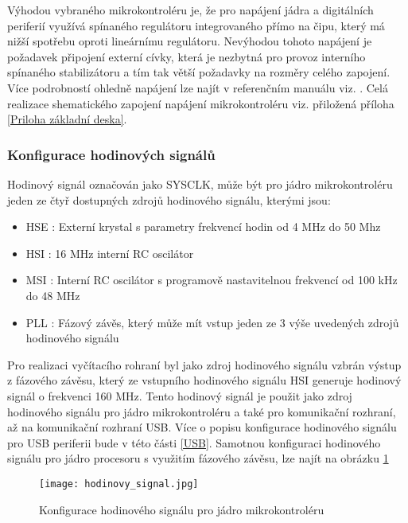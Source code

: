 	Výhodou vybraného mikrokontroléru je, že pro napájení jádra a digitálních periferií využívá spínaného regulátoru integrovaného přímo na čipu, který má nižší spotřebu oproti lineárnímu regulátoru. Nevýhodou tohoto napájení je požadavek připojení externí cívky, která je nezbytná pro provoz interního spínaného stabilizátoru a tím tak větší požadavky na rozměry celého zapojení. Více podrobností ohledně napájení lze najít v referenčním manuálu viz. \cite{STM32U5A9_RM}. Celá realizace shematického zapojení napájení mikrokontroléru viz. přiložená příloha \ref{Priloha základní deska}.
	
	\subsubsection{Konfigurace hodinových signálů} %
	Hodinový signál označován jako SYSCLK, může být pro jádro mikrokontroléru jeden ze čtyř dostupných zdrojů hodinového signálu, kterými jsou:
	\begin{itemize}
		\setlength\itemsep{0.005em}
		\item HSE : Externí krystal s parametry frekvencí hodin od 4 MHz do 50 Mhz
		\item HSI : 16 MHz interní RC oscilátor 
		\item MSI : Interní RC oscilátor s programově nastavitelnou frekvencí od 100 kHz do 48 MHz
		\item PLL : Fázový závěs, který může mít vstup jeden ze 3 výše uvedených zdrojů hodinového signálu
	\end{itemize}
	Pro realizaci vyčítacího rohraní byl jako zdroj hodinového signálu vzbrán výstup z fázového závěsu, který ze vstupního hodinového signálu HSI generuje hodinový signál o frekvenci 160 MHz. Tento hodinový signál je použit jako zdroj hodinového signálu pro jádro mikrokontroléru a také pro komunikační rozhraní, až na komunikační rozhraní USB. Více o popisu konfigurace hodinového signálu pro USB periferii bude v této části \ref{USB}. Samotnou konfiguraci hodinového signálu pro jádro procesoru s využitím fázového závěsu, lze najít na obrázku \ref{fig:hodinovy_signal}
	\begin{figure}[h!]
		\centering
		\captionsetup{justification=centering}
		\texttt{[image: hodinovy\_signal.jpg]}
		\caption{Konfigurace hodinového signálu pro jádro mikrokontroléru} 
		\label{fig:hodinovy_signal}
	\end{figure}

